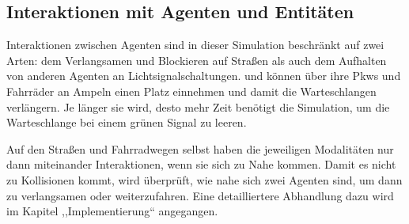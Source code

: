 %

\subsection{Interaktionen mit Agenten und Entitäten}\label{subsec:interactions}

Interaktionen zwischen Agenten sind in dieser Simulation beschränkt auf zwei Arten: dem Verlangsamen und Blockieren auf Straßen als auch dem Aufhalten von anderen Agenten an Lichtsignalschaltungen.
 und  können über ihre Pkws und Fahrräder an Ampeln einen Platz einnehmen und damit die Warteschlangen verlängern.
Je länger sie wird, desto mehr Zeit benötigt die Simulation, um die Warteschlange bei einem grünen Signal zu leeren.

Auf den Straßen und Fahrradwegen selbst haben die jeweiligen Modalitäten nur dann miteinander Interaktionen, wenn sie sich zu Nahe kommen.
Damit es nicht zu Kollisionen kommt, wird überprüft, wie nahe sich zwei Agenten sind, um dann zu verlangsamen oder weiterzufahren.
Eine detailliertere Abhandlung dazu wird im Kapitel ,,Implementierung`` angegangen.
